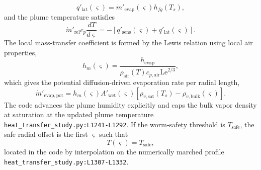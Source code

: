 \documentclass[11pt]{article}
\newcommand{\srcref}[1]{\nolinkurl{#1}}
\begin{document}
\begin{equation}
\label{eq:plume_latent_sink}
q'_{\mathrm{lat}}(\varsigma)=\dot m'_{\mathrm{evap}}(\varsigma)h_{fg}(T_s),
\end{equation}
and the plume temperature satisfies
\begin{equation}
\label{eq:plume_energy_ode}
\dot m'_{\mathrm{rel}}c_p\frac{dT}{d\varsigma}=-
\left[q'_{\mathrm{sens}}(\varsigma)+q'_{\mathrm{lat}}(\varsigma)\right].
\end{equation}
The local mass-transfer coefficient is formed by the Lewis relation using local air properties,
\begin{equation}
\label{eq:plume_mass_transfer}
h_m(\varsigma)=\frac{h_{\mathrm{evap}}}{\rho_{\mathrm{air}}(T)c_{p,\mathrm{air}}\mathrm{Le}^{2/3}},
\end{equation}
which gives the potential diffusion-driven evaporation rate per radial length,
\begin{equation}
\label{eq:plume_evap_potential}
\dot m'_{\mathrm{evap,pot}}=
h_m(\varsigma)A'_{\mathrm{wet}}(\varsigma)\left[\rho_{v,\mathrm{sat}}(T_s)-\rho_{v,\mathrm{bulk}}(\varsigma)\right].
\end{equation}
The code advances the plume humidity explicitly and caps the bulk vapor density at saturation at the updated plume temperature \srcref{heat_transfer_study.py:L1241-L1292}. If the worm-safety threshold is \(T_{\mathrm{safe}}\), the safe radial offset is the first \(\varsigma\) such that
\begin{equation}
\label{eq:worm_safe_distance}
T(\varsigma)=T_{\mathrm{safe}},
\end{equation}
located in the code by interpolation on the numerically marched profile \srcref{heat_transfer_study.py:L1307-L1332}.
\end{document}
